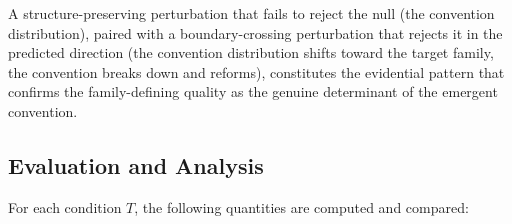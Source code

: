 \documentclass[a4paper,twoside,12pt]{report}
\begin{document}
    A structure-preserving perturbation that fails to reject the null (the
    convention distribution), paired with a boundary-crossing
    perturbation that rejects it in the predicted direction (the convention
    distribution shifts toward the target family, the convention breaks down and
    reforms), constitutes the evidential pattern that confirms the
    family-defining quality as the genuine determinant of the emergent
    convention.
    
    
    
    \subsection{Evaluation and Analysis}
    
    For each condition $T$, the following quantities are computed and compared:
    
\end{document}
